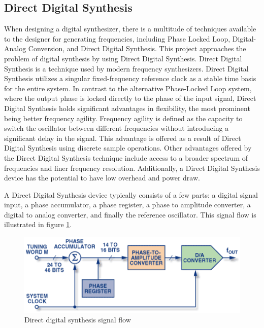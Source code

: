 \documentclass[a4paper,12pt]{report}
\begin{document}
\subsection{Direct Digital Synthesis}
\label{subsec:directdigitalsynth}
When designing a digital synthesizer, there is a multitude of techniques available to the designer for generating frequencies, including Phase Locked Loop, Digital-Analog Conversion, and Direct Digital Synthesis. This project approaches the problem of digital synthesis by using Direct Digital Synthesis. Direct Digital Synthesis is a technique used by modern frequency synthesizers. Direct Digital Synthesis utilizes a singular fixed-frequency reference clock as a stable time basis for the entire system. In contrast to the alternative Phase-Locked Loop system, where the output phase is locked directly to the phase of the input signal, Direct Digital Synthesis holds significant advantages in flexibility, the most prominent being better frequency agility. Frequency agility is defined as the capacity to switch the oscillator between different frequencies without introducing a significant delay in the signal. This advantage is offered as a result of Direct Digital Synthesis using discrete sample operations. Other advantages offered by the Direct Digital Synthesis technique include access to a broader spectrum of frequencies and finer frequency resolution. Additionally, a Direct Digital Synthesis device has the potential to have low overhead and power draw.

A Direct Digital Synthesis device typically consists of a few parts: a digital signal input, a phase accumulator, a phase register, a phase to amplitude converter, a digital to analog converter, and finally the reference oscillator. This signal flow is illustrated in figure \ref{fig:dds}.

\begin{figure}
    \centering
    \includegraphics[width=36em]{DDS.png}
    \caption{Direct digital synthesis signal flow}
    \label{fig:dds}
\end{figure}
\end{document}
